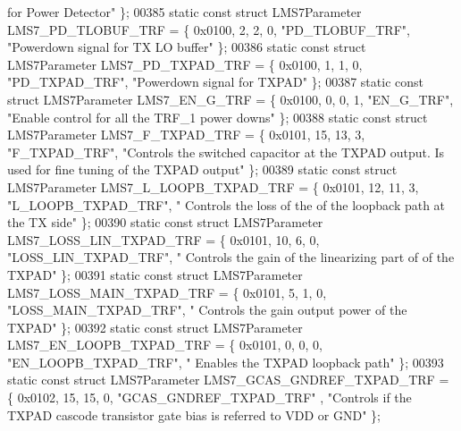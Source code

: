 \begin{DoxyCode}
{       for Power Detector"} \};
00385 \textcolor{keyword}{static} \textcolor{keyword}{const} \textcolor{keyword}{struct }LMS7Parameter LMS7_PD_TLOBUF_TRF = \{ 0x0100, 2, 2, 0, \textcolor{stringliteral}{"PD\_TLOBUF\_TRF"}, \textcolor{stringliteral}{"Powerdown
       signal for TX LO buffer"} \};
00386 \textcolor{keyword}{static} \textcolor{keyword}{const} \textcolor{keyword}{struct }LMS7Parameter LMS7_PD_TXPAD_TRF = \{ 0x0100, 1, 1, 0, \textcolor{stringliteral}{"PD\_TXPAD\_TRF"}, \textcolor{stringliteral}{"Powerdown signal
       for TXPAD"} \};
00387 \textcolor{keyword}{static} \textcolor{keyword}{const} \textcolor{keyword}{struct }LMS7Parameter LMS7_EN_G_TRF = \{ 0x0100, 0, 0, 1, \textcolor{stringliteral}{"EN\_G\_TRF"}, \textcolor{stringliteral}{"Enable control for all
       the TRF\_1 power downs"} \};
00388 \textcolor{keyword}{static} \textcolor{keyword}{const} \textcolor{keyword}{struct }LMS7Parameter LMS7_F_TXPAD_TRF = \{ 0x0101, 15, 13, 3, \textcolor{stringliteral}{"F\_TXPAD\_TRF"}, \textcolor{stringliteral}{"Controls the
       switched capacitor at the TXPAD output. Is used for fine tuning of the TXPAD output"} \};
00389 \textcolor{keyword}{static} \textcolor{keyword}{const} \textcolor{keyword}{struct }LMS7Parameter LMS7_L_LOOPB_TXPAD_TRF = \{ 0x0101, 12, 11, 3, \textcolor{stringliteral}{"L\_LOOPB\_TXPAD\_TRF"}, \textcolor{stringliteral}{"
      Controls the loss of the of the loopback path at the TX side"} \};
00390 \textcolor{keyword}{static} \textcolor{keyword}{const} \textcolor{keyword}{struct }LMS7Parameter LMS7_LOSS_LIN_TXPAD_TRF = \{ 0x0101, 10, 6, 0, \textcolor{stringliteral}{"LOSS\_LIN\_TXPAD\_TRF"}, \textcolor{stringliteral}{"
      Controls the gain of the linearizing part of of the TXPAD"} \};
00391 \textcolor{keyword}{static} \textcolor{keyword}{const} \textcolor{keyword}{struct }LMS7Parameter LMS7_LOSS_MAIN_TXPAD_TRF = \{ 0x0101, 5, 1, 0, \textcolor{stringliteral}{"LOSS\_MAIN\_TXPAD\_TRF"}, \textcolor{stringliteral}{"
      Controls the gain  output power of the TXPAD"} \};
00392 \textcolor{keyword}{static} \textcolor{keyword}{const} \textcolor{keyword}{struct }LMS7Parameter LMS7_EN_LOOPB_TXPAD_TRF = \{ 0x0101, 0, 0, 0, \textcolor{stringliteral}{"EN\_LOOPB\_TXPAD\_TRF"}, \textcolor{stringliteral}{"
      Enables the TXPAD loopback path"} \};
00393 \textcolor{keyword}{static} \textcolor{keyword}{const} \textcolor{keyword}{struct }LMS7Parameter LMS7_GCAS_GNDREF_TXPAD_TRF = \{ 0x0102, 15, 15, 0, \textcolor{stringliteral}{"GCAS\_GNDREF\_TXPAD\_TRF"}
      , \textcolor{stringliteral}{"Controls if the TXPAD cascode transistor gate bias is referred to VDD or GND"} \};

\end{DoxyCode}

